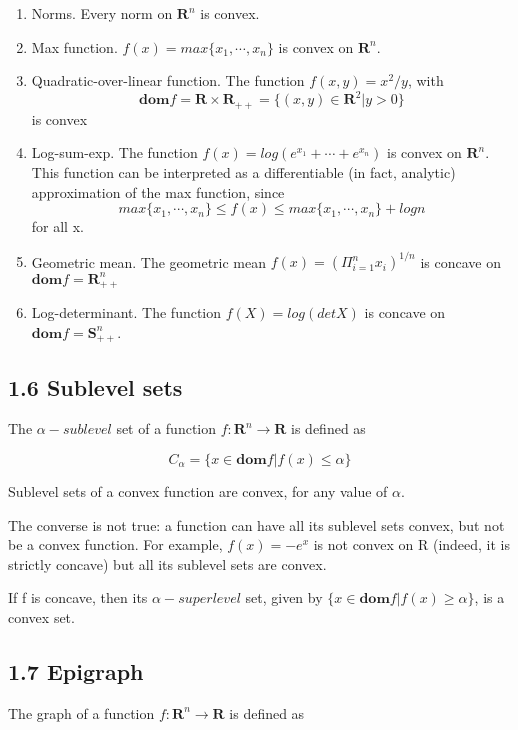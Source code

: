 \documentclass{article}
\begin{document}
\begin{enumerate}
    \item Norms. Every norm on $\mathbf{R}^n$ is convex.
    \item Max function. $f(x) = max\{x_1,\cdots,x_n\}$ is convex on $\mathbf{R}^n$.
    \item Quadratic-over-linear function. The function $f(x, y) = x^2/y$, with
    \[
    \mathbf{dom} f=\mathbf{R\times R_{++}}=\{(x,y)\in \mathbf{R}^2|y>0\}    
    \]
    is convex
    \item Log-sum-exp. The function $f(x)=log(e^{x_1} +\cdots+ e^{x_n})$ is convex on $\mathbf{R}^n$.
    This function can be interpreted as a differentiable (in fact, analytic) approximation
    of the max function, since
    \[
    max\{x_1,\cdots,x_n\}\le f(x)\le max\{x_1,\cdots,x_n\}+log n 
    \]
    for all x.
    \item Geometric mean. The geometric mean $f(x)=(\Pi_{i=1}^nx_i)^{1/n}$ is concave on $\mathbf{dom}f=\mathbf{R}^n_{++}$
    \item Log-determinant. The function $f(X)=log(detX)$ is concave on $\mathbf{dom}f =\mathbf{S}^n_{++}$.
\end{enumerate}



\subsection*{1.6 Sublevel sets}

The $\alpha-sublevel$ set of a function $f : \mathbf{R}^n \rightarrow \mathbf{R}$ is defined as

\[
C_\alpha=\{x\in\mathbf{dom}f|f(x)\le \alpha\}    
\]

Sublevel sets of a convex function are convex, for any value of $\alpha$.

The converse is not true: a function can have all its sublevel sets convex, but
not be a convex function. For example, $f(x)=-e^x$ is not convex on R (indeed, it
is strictly concave) but all its sublevel sets are convex.

If f is concave, then its $\alpha-superlevel$ set, given by $\{x\in\mathbf{dom}f|f(x)\ge\alpha\}$, is a
convex set.

\subsection*{1.7 Epigraph}

The graph of a function $f : \mathbf{R}^n \rightarrow \mathbf{R}$ is defined as
\end{document}
